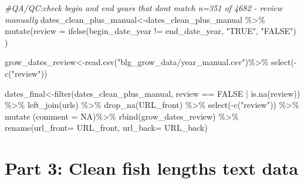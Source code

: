 \documentclass[
]{article}
\newenvironment{Shaded}{\begin{snugshade}}{\end{snugshade}}
\newcommand{\AttributeTok}[1]{\textcolor[rgb]{0.77,0.63,0.00}{#1}}
\newcommand{\CommentTok}[1]{\textcolor[rgb]{0.56,0.35,0.01}{\textit{#1}}}
\newcommand{\ConstantTok}[1]{\textcolor[rgb]{0.00,0.00,0.00}{#1}}
\newcommand{\FunctionTok}[1]{\textcolor[rgb]{0.00,0.00,0.00}{#1}}
\newcommand{\NormalTok}[1]{#1}
\newcommand{\OtherTok}[1]{\textcolor[rgb]{0.56,0.35,0.01}{#1}}
\newcommand{\SpecialCharTok}[1]{\textcolor[rgb]{0.00,0.00,0.00}{#1}}
\newcommand{\StringTok}[1]{\textcolor[rgb]{0.31,0.60,0.02}{#1}}
\begin{document}
\begin{Shaded}
\begin{Highlighting}[]
\CommentTok{\#QA/QC:check begin and end years that don\textquotesingle{}t match n=351 of 4682  {-} review manually }
\NormalTok{dates\_clean\_plus\_manual}\OtherTok{\textless{}{-}}\NormalTok{dates\_clean\_plus\_manual }\SpecialCharTok{\%\textgreater{}\%} 
  \FunctionTok{mutate}\NormalTok{(}\AttributeTok{review =} \FunctionTok{ifelse}\NormalTok{(begin\_date\_year }\SpecialCharTok{!=}\NormalTok{ end\_date\_year, }\StringTok{"TRUE"}\NormalTok{, }\StringTok{"FALSE"}\NormalTok{)}
\NormalTok{  )}

\NormalTok{grow\_dates\_review}\OtherTok{\textless{}{-}}\FunctionTok{read.csv}\NormalTok{(}\StringTok{"blg\_grow\_data/year\_manual.csv"}\NormalTok{)}\SpecialCharTok{\%\textgreater{}\%} 
  \FunctionTok{select}\NormalTok{(}\SpecialCharTok{{-}}\FunctionTok{c}\NormalTok{(}\StringTok{"review"}\NormalTok{))}

\NormalTok{dates\_final}\OtherTok{\textless{}{-}}\FunctionTok{filter}\NormalTok{(dates\_clean\_plus\_manual, review }\SpecialCharTok{==} \StringTok{\textquotesingle{}FALSE\textquotesingle{}} \SpecialCharTok{|} \FunctionTok{is.na}\NormalTok{(review)) }\SpecialCharTok{\%\textgreater{}\%} 
                \FunctionTok{left\_join}\NormalTok{(urls) }\SpecialCharTok{\%\textgreater{}\%} 
                \FunctionTok{drop\_na}\NormalTok{(}\StringTok{\textquotesingle{}URL\_front\textquotesingle{}}\NormalTok{) }\SpecialCharTok{\%\textgreater{}\%} 
                \FunctionTok{select}\NormalTok{(}\SpecialCharTok{{-}}\FunctionTok{c}\NormalTok{(}\StringTok{"review"}\NormalTok{)) }\SpecialCharTok{\%\textgreater{}\%}
                \FunctionTok{mutate}\NormalTok{ (}\AttributeTok{comment =} \ConstantTok{NA}\NormalTok{)}\SpecialCharTok{\%\textgreater{}\%}
                \FunctionTok{rbind}\NormalTok{(grow\_dates\_review) }\SpecialCharTok{\%\textgreater{}\%} 
            \FunctionTok{rename}\NormalTok{(}\AttributeTok{url\_front=}\NormalTok{ URL\_front, }\AttributeTok{url\_back=}\NormalTok{ URL\_back)}
\end{Highlighting}
\end{Shaded}

\hypertarget{part-3-clean-fish-lengths-text-data}{%
\section{Part 3: Clean fish lengths text
data}\label{part-3-clean-fish-lengths-text-data}}
\end{document}
